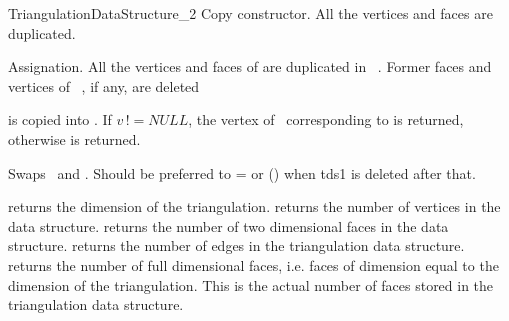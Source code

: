 \begin{ccRefConcept}{TriangulationDataStructure_2}
{Copy constructor. All the vertices and faces are duplicated.}

{Assignation. All the vertices and faces of  are duplicated
in \ccVar\ . Former faces and vertices of \ccVar\ , if any, are
deleted}


{ is copied into \ccVar. If $v\, !\!= NULL$, the vertex of \ccVar\ 
corresponding to  is returned, otherwise  
is returned.
}

{Swaps \ccVar\ and . Should be preferred to \ccVar= or \ccVar(\ccc{tds1})
when tds1 is deleted after that.}

\ccAccessFunctions
{}
{returns the dimension of the triangulation.}
\ccGlue
{}
{returns the number of vertices in the data structure.}
\ccGlue
{}
{returns the number of two dimensional faces in the data structure.}
\ccGlue
{}
{returns the number of edges  in the triangulation data structure.}
\ccGlue
{}
{returns the  number of full dimensional faces, 
i.e. faces of dimension equal to the dimension
of the triangulation. This is the actual
number of faces stored in the triangulation data structure.}

\begin{ccAdvanced}
\end{ccAdvanced}



\end{ccRefConcept}
